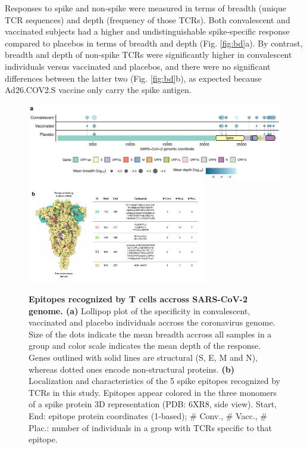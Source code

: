 Responses to \covid{} spike and non-spike were measured in terms of breadth (unique TCR sequences) and depth (frequency of those TCRs). Both convalescent and vaccinated subjects had a higher and undistinguishable spike-specific response compared to placebos in terms of breadth and depth (Fig. \ref{fig:bd}a). By contrast, breadth and depth of non-spike TCRs were significantly higher in convalescent individuals versus vaccinated and placebos, and there were no significant differences between the latter two (Fig. \ref{fig:bd}b), as expected because Ad26.COV2.S vaccine only carry the spike antigen.


\begin{figure}[!t]
	\centering
	\includegraphics[width=\textwidth,keepaspectratio]{figures/hits.pdf}
	\includegraphics[width=0.7\textwidth,keepaspectratio]{figures/spike_w_table.pdf}
	\caption{\textbf{Epitopes recognized by T cells accross SARS-CoV-2 genome. (a)} Lollipop plot of the \TCRB{} \covid{} specificity in convalescent, vaccinated and placebo individuals accross the coronavirus genome. Size of the dots indicate the mean breadth accross all samples in a group and color scale indicates the mean depth of the response. Genes outlined with solid lines are structural (S, E, M and N), whereas dotted ones encode non-structural proteins. \textbf{(b)} Localization and characteristics of the 5 \covid{} spike epitopes recognized by TCRs in this study. Epitopes appear colored in the three monomers of a spike protein 3D representation (PDB: 6XR8, side view). Start, End: epitope protein coordinates (1-based); \# Conv., \# Vacc., \# Plac.: number of individuals in a group with TCRs specific to that epitope.}
	\label{fig:hits}
\end{figure}

